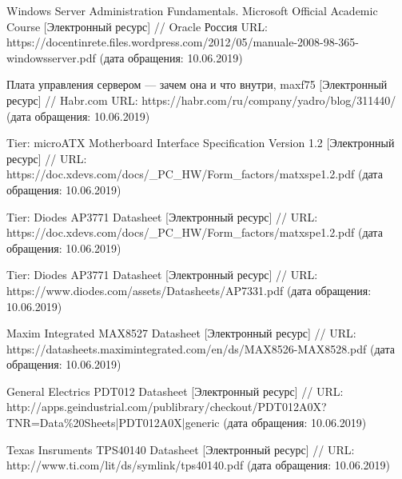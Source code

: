 \begingroup 
\renewcommand{\section}[2]{\anonsection{Библиографический список}}
\begin{thebibliography}{00}

    Windows Server Administration Fundamentals. Microsoft Official Academic Course
    [Электронный ресурс] //
    Oracle Россия
    URL: https://docentinrete.files.wordpress.com/2012/05/manuale-2008-98-365-windowsserver.pdf
    (дата обращения: 10.06.2019)

Плата управления сервером — зачем она и что внутри, maxf75
[Электронный ресурс] //
Habr.com
URL: https://habr.com/ru/company/yadro/blog/311440/
(дата обращения: 10.06.2019)

Tier: microATX Motherboard Interface Specification
Version 1.2 
[Электронный ресурс] //
URL: https://doc.xdevs.com/docs/\_PC\_HW/Form\_factors/matxspe1.2.pdf
(дата обращения: 10.06.2019)

Tier: Diodes AP3771 Datasheet
[Электронный ресурс] //
URL: https://doc.xdevs.com/docs/\_PC\_HW/Form\_factors/matxspe1.2.pdf
(дата обращения: 10.06.2019)


    Tier: Diodes AP3771 Datasheet
    [Электронный ресурс] //
    URL: https://www.diodes.com/assets/Datasheets/AP7331.pdf
    (дата обращения: 10.06.2019)

    Maxim Integrated MAX8527 Datasheet
    [Электронный ресурс] //
    URL: https://datasheets.maximintegrated.com/en/ds/MAX8526-MAX8528.pdf
    (дата обращения: 10.06.2019)

    General Electrics PDT012 Datasheet 
    [Электронный ресурс] //
    URL: http://apps.geindustrial.com/publibrary/checkout/PDT012A0X?TNR=Data\%20Sheets|PDT012A0X|generic
    (дата обращения: 10.06.2019)

    Texas Insruments TPS40140 Datasheet
    [Электронный ресурс] //
    URL: http://www.ti.com/lit/ds/symlink/tps40140.pdf
    (дата обращения: 10.06.2019)

\end{thebibliography}
\endgroup

\clearpage
